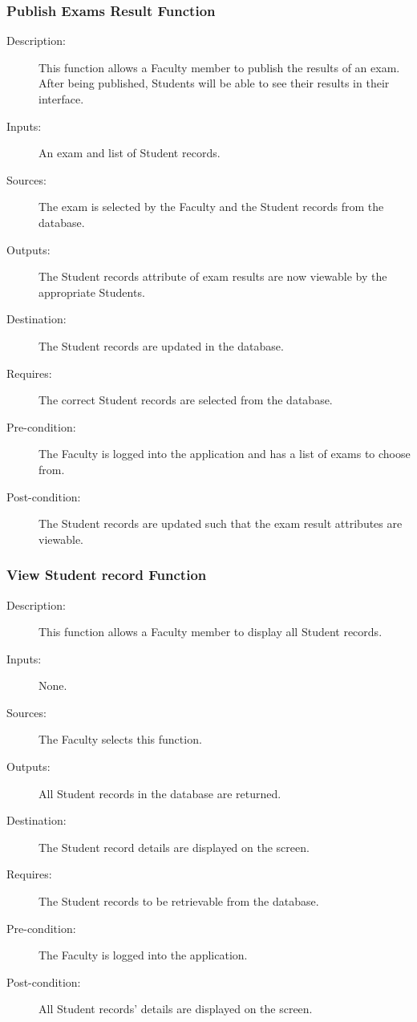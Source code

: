 \subsubsection{\large Publish Exams Result Function} 
\begin{boxed} %
\small\begin{description}
\item[Description:]
   This function allows a Faculty member to publish the results of an exam.
   After being published, Students will be able to see their results in their
   interface.
\item[Inputs:]
   An exam and list of Student records.
\item[Sources:]
   The exam is selected by the Faculty and the Student records 
   from the database.
\item[Outputs:]
   The Student records attribute of exam results are now viewable by the
   appropriate Students.
\item[Destination:]
   The Student records are updated in the database.
\item[Requires:]
   The correct Student records are selected from the database.
\item[Pre-condition:]
   The Faculty is logged into the application and has a list of exams to
   choose from.
\item[Post-condition:]
   The Student records are updated such that the exam result attributes
   are viewable.
\end{description}
\normalsize
\end{boxed} %

\subsubsection{\large View Student record Function} 
\begin{boxed} %
\small\begin{description}
\item[Description:]
   This function allows a Faculty member to display all Student records.
\item[Inputs:]
   None.
\item[Sources:]
   The Faculty selects this function.
\item[Outputs:]
   All Student records in the database are returned.
\item[Destination:]
   The Student record details are displayed on the screen.
\item[Requires:]
   The Student records to be retrievable from the database.
\item[Pre-condition:]
   The Faculty is logged into the application.
\item[Post-condition:]
   All Student records' details are displayed on the screen.
\end{description}
\normalsize
\end{boxed} %

